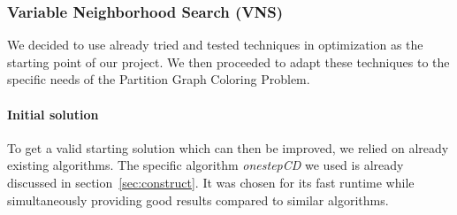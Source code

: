 \documentclass[paper = a4, fontsize = 10pt]{scrartcl}
\begin{document}




\subsubsection{Variable Neighborhood Search (VNS)}
We decided to use already tried and tested techniques in optimization as the starting point of our project. We then proceeded to adapt these techniques to the specific needs of the Partition Graph Coloring Problem.


\paragraph{Initial solution}{
To get a valid starting solution which can then be improved, we relied on already existing algorithms. The specific algorithm \emph{onestepCD} we used is already discussed in section~\ref{sec:construct}. It was chosen for its fast runtime while simultaneously providing good results compared to similar algorithms.

}
\end{document}
